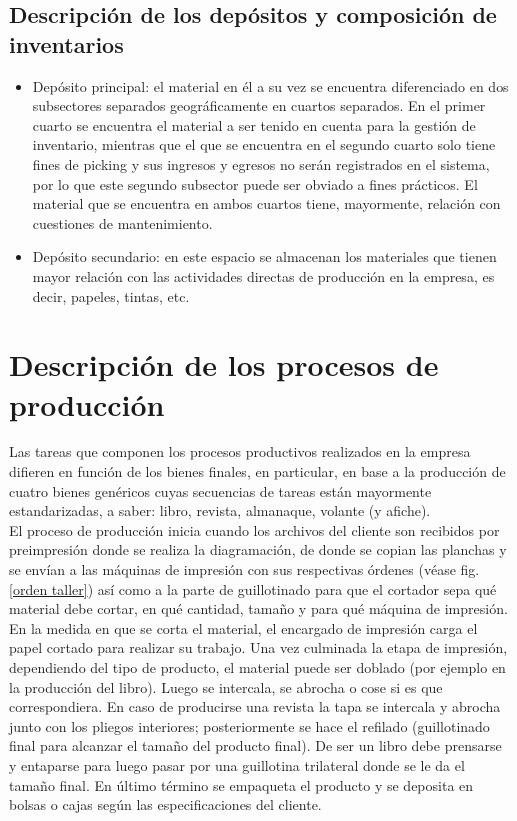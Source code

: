 \documentclass[a4paper, 12pt,twoside]{report}  %
\numberwithin{equation}{subsection} %
\begin{document}
 \subsection{Descripción de los depósitos y composición de inventarios}

 \begin{itemize}
 \item Depósito principal: el material en él a su vez se encuentra diferenciado en dos subsectores separados geográficamente en cuartos separados. En el primer cuarto se encuentra el material a ser tenido en cuenta para la gestión de inventario, mientras que el que se encuentra en el segundo cuarto solo tiene fines de picking y sus ingresos y egresos no serán registrados en el sistema, por lo que este segundo subsector puede ser obviado a fines prácticos. El material que se encuentra en ambos cuartos tiene, mayormente, relación con cuestiones de mantenimiento.
\item Depósito secundario: en este espacio se almacenan los materiales que tienen mayor relación con las actividades directas de producción en la empresa, es decir, papeles, tintas, etc.
 \end{itemize}

 \section{Descripción de los procesos de producción} Las tareas que componen los procesos productivos realizados en la empresa difieren en función de los bienes finales, en particular, en base a la producción de cuatro bienes genéricos cuyas secuencias de tareas están mayormente estandarizadas, a saber: libro, revista, almanaque, volante (y afiche).\\
 \indent El proceso de producción inicia cuando los archivos del cliente son recibidos por preimpresión donde se realiza la diagramación, de donde se copian las planchas y se envían a las máquinas de impresión con sus respectivas órdenes (véase fig. \ref{orden taller}) así como a la parte de guillotinado para que el cortador sepa qué material debe cortar, en qué cantidad, tamaño y para qué máquina de impresión. En la medida en que se corta el material, el encargado de impresión carga el papel cortado para realizar su trabajo. Una vez culminada la etapa de impresión, dependiendo del tipo de producto, el material puede ser doblado (por ejemplo en la producción del libro). Luego se intercala, se abrocha o cose si es que correspondiera. En caso de producirse una revista la tapa se intercala y abrocha junto con los pliegos interiores; posteriormente se hace el refilado (guillotinado final para alcanzar el tamaño del producto final). De ser un libro debe prensarse y entaparse para luego pasar por una guillotina trilateral donde se le da el tamaño final. En último término se empaqueta el producto y se deposita en bolsas o cajas según las especificaciones del cliente.
\end{document}
